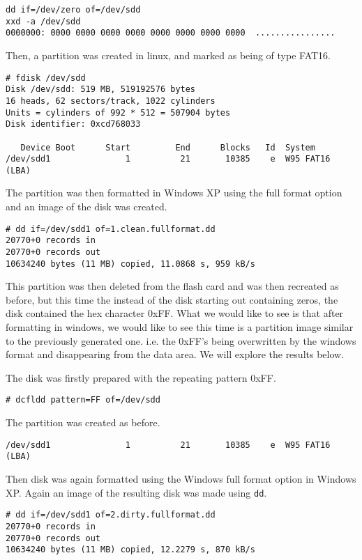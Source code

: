 \documentclass[a4paper,
    11pt,
    normalheadings,
    parindent,
    UKenglish,
    abstracton,
    ]{scrartcl}
\begin{document}
\begin{verbatim}
dd if=/dev/zero of=/dev/sdd
xxd -a /dev/sdd 
0000000: 0000 0000 0000 0000 0000 0000 0000 0000  ................
\end{verbatim}

Then, a partition was created in linux, and marked as being of type FAT16.
\begin{verbatim}
# fdisk /dev/sdd
Disk /dev/sdd: 519 MB, 519192576 bytes
16 heads, 62 sectors/track, 1022 cylinders
Units = cylinders of 992 * 512 = 507904 bytes
Disk identifier: 0xcd768033

   Device Boot      Start         End      Blocks   Id  System
/dev/sdd1               1          21       10385    e  W95 FAT16 (LBA)
\end{verbatim}

The partition was then formatted in Windows XP using the full format option and an image of the disk was created.
\begin{verbatim}
# dd if=/dev/sdd1 of=1.clean.fullformat.dd
20770+0 records in
20770+0 records out
10634240 bytes (11 MB) copied, 11.0868 s, 959 kB/s
\end{verbatim}

This partition was then deleted from the flash card and was then recreated as before, but this time the instead of the disk starting out containing zeros, the disk contained the hex character 0xFF. What we would like to see is that after formatting in windows, we would like to see this time is a partition image similar to the previously generated one. i.e. the 0xFF's being overwritten by the windows format and disappearing from the data area. We will explore the results below.

The disk was firstly prepared with the repeating pattern 0xFF.
\begin{verbatim}
# dcfldd pattern=FF of=/dev/sdd
\end{verbatim}

The partition was created as before. 
\begin{verbatim}
/dev/sdd1               1          21       10385    e  W95 FAT16 (LBA)
\end{verbatim}

Then disk was again formatted using the Windows full format option in Windows XP. Again an image of the resulting disk was made using \texttt{dd}.

\begin{verbatim}
# dd if=/dev/sdd1 of=2.dirty.fullformat.dd
20770+0 records in
20770+0 records out
10634240 bytes (11 MB) copied, 12.2279 s, 870 kB/s
\end{verbatim}
\end{document}
